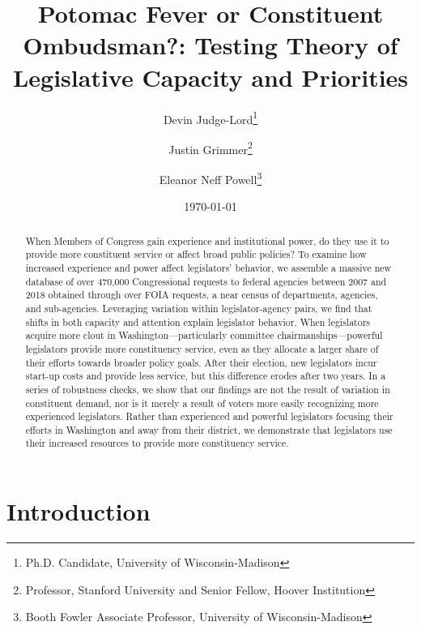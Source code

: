 \documentclass[12pt]{article}
\title{Potomac Fever or Constituent Ombudsman?: Testing Theory of Legislative Capacity and Priorities}
\author{Devin Judge-Lord\thanks{Ph.D. Candidate, University of Wisconsin-Madison}\and Justin Grimmer\thanks{Professor, Stanford University and Senior Fellow, Hoover Institution} \and Eleanor Neff Powell\thanks{Booth Fowler Associate Professor, University of Wisconsin-Madison}}
\date{\today}
\begin{document}
\maketitle




\begin{abstract}
\noindent 
When Members of Congress gain experience and institutional power, do they use it to provide more constituent service or affect broad public policies? To examine how increased experience and power affect legislators' behavior, we assemble a massive new database of over 470,000 Congressional requests to federal agencies between 2007 and 2018 obtained through over  FOIA requests, a near census of departments, agencies, and sub-agencies. Leveraging variation within legislator-agency pairs, we find that shifts in both capacity and attention explain legislator behavior. When legislators acquire more clout in Washington---particularly committee chairmanships---powerful legislators provide more constituency service, even as they allocate a larger share of their efforts towards broader policy goals. After their election, new legislators incur start-up costs and provide less service, but this difference erodes after two years. In a series of robustness checks, we show that our findings are not the result of variation in constituent demand, nor is it merely a result of voters more easily recognizing more experienced legislators. Rather than experienced and powerful legislators focusing their efforts in Washington and away from their district, we demonstrate that legislators use their increased resources to provide more constituency service. 
\end{abstract}



%

%

\newpage
\tableofcontents
\doublespacing
\section{Introduction}
\end{document}
